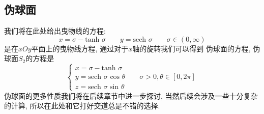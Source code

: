 \documentclass[./main.tex]{subfiles}
\begin{document}
\subsection{伪球面}
我们将在此处给出曳物线的方程: 
\[
    x=\sigma-\text{tanh }\sigma\qquad
    y=\text{sech }\sigma\qquad \sigma\in(0,\infty)
\]
是在$xOy$平面上的曳物线方程, 通过对于$x$轴的旋转我们可以得到
伪球面的方程, 伪球面$S_2$的方程是
\[
\begin{cases}
x=\sigma-\text{tanh }\sigma\\

y=\text{sech }\sigma\text{ cos }\theta\qquad \sigma>0,\theta\in[0,2\pi]\\

z=\text{sech }\sigma\text{ sin }\theta
\end{cases}
\]
伪球面的更多性质我们将在后续章节中进一步探讨, 当然后续会涉及一些十分复杂的计算, 
所以在此处和它打好交道总是不错的选择. 
\end{document}
